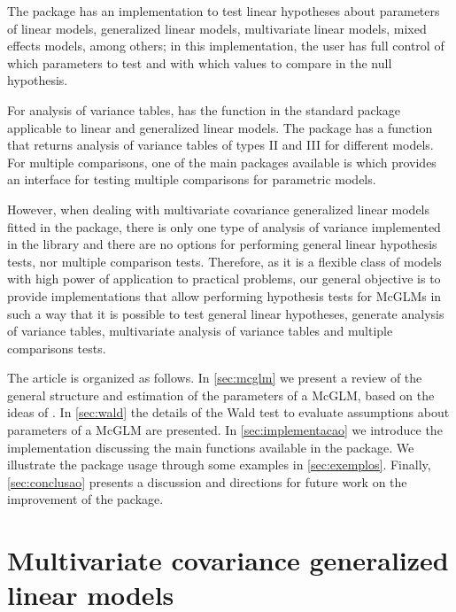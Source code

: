 \documentclass[article]{jss}\usepackage[]{graphicx}\usepackage[]{xcolor}
\begin{document}
The package  \citep{car} has an implementation to test linear hypotheses about parameters of linear models, generalized linear models, multivariate linear models, mixed effects models, among others; in this implementation, the user has full control of which parameters to test and with which values to compare in the null hypothesis.

For analysis of variance tables,  has the function  in the standard package  \citep{R2022} applicable to linear and generalized linear models. The package  \citep{car} has a function that returns analysis of variance tables of types II and III for different models. For multiple comparisons, one of the main packages available is  \citep{multcomp} which provides an interface for testing multiple comparisons for parametric models.

However, when dealing with multivariate covariance generalized linear models fitted in the  package, there is only one type of analysis of variance implemented in the library and there are no options for performing general linear hypothesis tests, nor multiple comparison tests. Therefore, as it is a flexible class of models with high power of application to practical problems, our general objective is to provide implementations that allow performing hypothesis tests for McGLMs in such a way that it is possible to test general linear hypotheses, generate analysis of variance tables, multivariate analysis of variance tables and multiple comparisons tests.

The article is organized as follows. In \autoref{sec:mcglm} we present a review of the general structure and estimation of the parameters of a McGLM, based on the ideas of \citet{Bonat16}. In \autoref{sec:wald} the details of the Wald test to evaluate assumptions about parameters of a McGLM are presented. In \autoref{sec:implementacao} we introduce the  implementation discussing the main functions available in the  package. We illustrate the package usage through some examples in \autoref{sec:exemplos}. Finally, \autoref{sec:conclusao} presents a discussion and directions for future work on the improvement of the  package.


\section{Multivariate covariance generalized linear models}\label{sec:mcglm}
\end{document}
